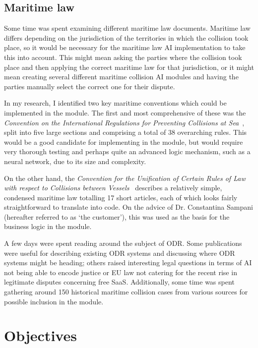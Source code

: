 \subsection{Maritime law}

Some time was spent examining different maritime law documents. Maritime law differs depending on the jurisdiction of the territories in which the collision took place, so it would be necessary for the maritime law AI implementation to take this into account. This might mean asking the parties where the collision took place and then applying the correct maritime law for that jurisdiction, or it might mean creating several different maritime collision AI modules and having the parties manually select the correct one for their dispute.

In my research, I identified two key maritime conventions which could be implemented in the module. The first and most comprehensive of these was the \emph{Convention on the International Regulations for Preventing Collisions at Sea}~\cite{law:long}, split into five large sections and comprising a total of 38 overarching rules. This would be a good candidate for implementing in the module, but would require very thorough testing and perhaps quite an advanced logic mechanism, such as a neural network, due to its size and complexity.

On the other hand, the \emph{Convention for the Unification of Certain Rules of Law with respect to Collisions between Vessels}~\cite{law:short} describes a relatively simple, condensed maritime law totalling 17 short articles, each of which looks fairly straightforward to translate into code. On the advice of Dr. Constantina Sampani (hereafter referred to as `the customer'), this was used as the basis for the business logic in the module.

A few days were spent reading around the subject of ODR. Some publications were useful for describing existing ODR systems \cite{br:cyberMediation} and discussing where ODR systems might be heading; \cite{br:generations}  others raised interesting legal questions in terms of AI not being able to encode justice \cite{br:gameTheory} or EU law not catering for the recent rise in legitimate disputes concerning free SaaS. \cite{br:cloudComputing} Additionally, some time was spent gathering around 150 historical maritime collision cases from various sources for possible inclusion in the module. \cite{cases1}\cite{cases2}\cite{cases3}

\section{Objectives}

